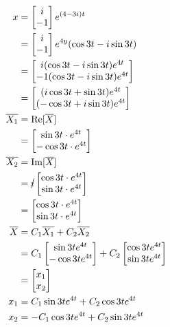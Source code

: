 \documentclass[10pt, letterpaper]{article}
\begin{document}
\begin{align*}
x &= \begin{bmatrix}
	i\\
	-1
\end{bmatrix} e^{(4-3i)t}\\
&= \begin{bmatrix}
	i\\
	-1
\end{bmatrix} e^{4y}(\cos 3t-i\sin 3t)\\
&= \begin{bmatrix}
	i(\cos3t-i\sin3t)e^{4t}\\
	-1(\cos3t-i\sin3t)e^{4t}
\end{bmatrix}\\
&= \begin{bmatrix}
	(i\cos3t+\sin3t)e^{4t}\\
	(-\cos3t+i\sin3t)e^{4t}
\end{bmatrix}\\
\overline{X_1} &= \text{Re}[\overline{X}]\\
&= \begin{bmatrix}
	\sin3t \cdot e^{4t}\\
	-\cos 3t \cdot e^{4t}
\end{bmatrix}\\
\overline{X_2} &= \text{Im}[\overline{X}]\\
&= \cancel{i}\begin{bmatrix}
	\cos3t \cdot e^{4t}\\
	\sin3t \cdot e^{4t}
\end{bmatrix}\\
&= \begin{bmatrix}
	\cos3t \cdot e^{4t}\\
	\sin3t \cdot e^{4t}
\end{bmatrix}\\
\overline{X} &= C_1\overline{X_1}+C_2\overline{X_2}\\
&= C_1\begin{bmatrix}
	\sin3te^{4t}\\
	-\cos3te^{4t}
\end{bmatrix} + C_2 \begin{bmatrix}
	\cos3te^{4t}\\
	\sin3te^{4t}
\end{bmatrix}\\
&= \begin{bmatrix}
	x_1\\
	x_2
\end{bmatrix}\\
x_1 &= C_1\sin3te^{4t}+C_2\cos3te^{4t}\\
x_2 &= -C_1\cos3te^{4t}+C_2\sin3te^{4t}
\end{align*}
\end{document}
